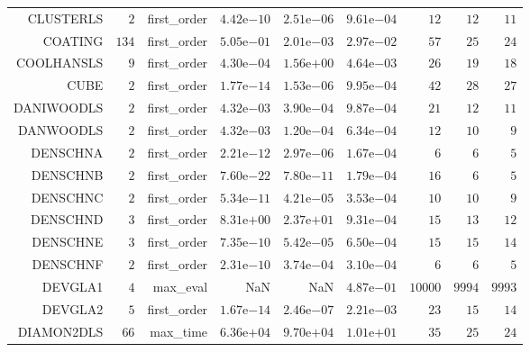 \begin{longtable}{rrrrrrrrr}
CLUSTERLS & \(     2\) & first\_order & \( 4.42\)e\(-10\) & \( 2.51\)e\(-06\) & \( 9.61\)e\(-04\) & \(    12\) & \(    12\) & \(    11\) \\
COATING & \(   134\) & first\_order & \( 5.05\)e\(-01\) & \( 2.01\)e\(-03\) & \( 2.97\)e\(-02\) & \(    57\) & \(    25\) & \(    24\) \\
COOLHANSLS & \(     9\) & first\_order & \( 4.30\)e\(-04\) & \( 1.56\)e\(+00\) & \( 4.64\)e\(-03\) & \(    26\) & \(    19\) & \(    18\) \\
CUBE & \(     2\) & first\_order & \( 1.77\)e\(-14\) & \( 1.53\)e\(-06\) & \( 9.95\)e\(-04\) & \(    42\) & \(    28\) & \(    27\) \\
DANIWOODLS & \(     2\) & first\_order & \( 4.32\)e\(-03\) & \( 3.90\)e\(-04\) & \( 9.87\)e\(-04\) & \(    21\) & \(    12\) & \(    11\) \\
DANWOODLS & \(     2\) & first\_order & \( 4.32\)e\(-03\) & \( 1.20\)e\(-04\) & \( 6.34\)e\(-04\) & \(    12\) & \(    10\) & \(     9\) \\
DENSCHNA & \(     2\) & first\_order & \( 2.21\)e\(-12\) & \( 2.97\)e\(-06\) & \( 1.67\)e\(-04\) & \(     6\) & \(     6\) & \(     5\) \\
DENSCHNB & \(     2\) & first\_order & \( 7.60\)e\(-22\) & \( 7.80\)e\(-11\) & \( 1.79\)e\(-04\) & \(    16\) & \(     6\) & \(     5\) \\
DENSCHNC & \(     2\) & first\_order & \( 5.34\)e\(-11\) & \( 4.21\)e\(-05\) & \( 3.53\)e\(-04\) & \(    10\) & \(    10\) & \(     9\) \\
DENSCHND & \(     3\) & first\_order & \( 8.31\)e\(+00\) & \( 2.37\)e\(+01\) & \( 9.31\)e\(-04\) & \(    15\) & \(    13\) & \(    12\) \\
DENSCHNE & \(     3\) & first\_order & \( 7.35\)e\(-10\) & \( 5.42\)e\(-05\) & \( 6.50\)e\(-04\) & \(    15\) & \(    15\) & \(    14\) \\
DENSCHNF & \(     2\) & first\_order & \( 2.31\)e\(-10\) & \( 3.74\)e\(-04\) & \( 3.10\)e\(-04\) & \(     6\) & \(     6\) & \(     5\) \\
DEVGLA1 & \(     4\) & max\_eval &       NaN &       NaN & \( 4.87\)e\(-01\) & \( 10000\) & \(  9994\) & \(  9993\) \\
DEVGLA2 & \(     5\) & first\_order & \( 1.67\)e\(-14\) & \( 2.46\)e\(-07\) & \( 2.21\)e\(-03\) & \(    23\) & \(    15\) & \(    14\) \\
DIAMON2DLS & \(    66\) & max\_time & \( 6.36\)e\(+04\) & \( 9.70\)e\(+04\) & \( 1.01\)e\(+01\) & \(    35\) & \(    25\) & \(    24\) \\

\end{longtable}
